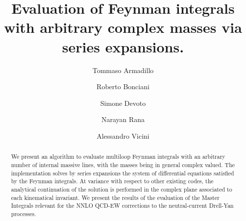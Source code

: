 \documentclass[review]{elsarticle}
\begin{document}
\newcommand{\be}{\begin{equation}}
\newcommand{\ee}{\end{equation}}
\newcommand{\bea}{\begin{eqnarray}}
\newcommand{\eea}{\end{eqnarray}}

\begin{frontmatter}

\title{Evaluation of Feynman integrals with arbitrary complex masses via series expansions.}

\author[a,b]{Tommaso Armadillo}
\author[c]{Roberto Bonciani}
\author[b,d]{Simone Devoto}
\author[b,d,e]{Narayan Rana}
\author[b,d]{Alessandro Vicini}

\address[a]{Centre for Cosmology, Particle Physics and Phenomenology (CP3),
Université Catholique de Louvain, Chemin du Cyclotron, B-1348 Louvain la Neuve, Belgium}
\address[b]{Dipartimento di Fisica ``Aldo Pontremoli'', University of Milano, Via Celoria 16, 20133 Milano, Italy}
\address[c]{Dipartimento di Fisica, Universit\`{a} di Roma ``La Sapienza'' and INFN Sezione di Roma, Piazzale Aldo Moro 5, I-00185 Roma, Italy}
\address[d]{INFN Sezione di Milano, Via Celoria 16, 20133 Milano, Italy}
\address[e]{Department of Physics, Indian Institute of Technology Kanpur, 208016 Kanpur, India}





\begin{abstract}
  We present an algorithm to evaluate multiloop Feynman integrals
  with an arbitrary number of internal massive lines,
  with the masses being in general complex valued.
  The implementation solves by series expansions
  the system of differential equations
  satisfied by the Feynman integrals.
  At variance with respect to other existing codes,
  the analytical continuation of the solution is performed
  in the complex plane associated to each kinematical invariant.
  We present the results of the evaluation of the Master Integrals
  relevant for the NNLO QCD-EW corrections to
  the neutral-current Drell-Yan processes.
\end{abstract}


\end{frontmatter}

\linenumbers













%


 
\end{document}
